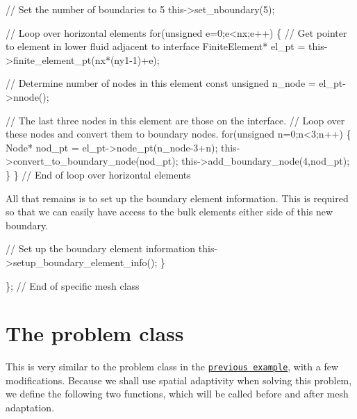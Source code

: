 \begin{DoxyCodeInclude}
   \textcolor{comment}{// Set the number of boundaries to 5}
   this->set\_nboundary(5);

   \textcolor{comment}{// Loop over horizontal elements}
   \textcolor{keywordflow}{for}(\textcolor{keywordtype}{unsigned} e=0;e<nx;e++)
    \{
     \textcolor{comment}{// Get pointer to element in lower fluid adjacent to interface}
     FiniteElement* el\_pt = this->finite\_element\_pt(nx*(ny1-1)+e);

     \textcolor{comment}{// Determine number of nodes in this element}
     \textcolor{keyword}{const} \textcolor{keywordtype}{unsigned} n\_node = el\_pt->nnode();

     \textcolor{comment}{// The last three nodes in this element are those on the interface.}
     \textcolor{comment}{// Loop over these nodes and convert them to boundary nodes.}
     \textcolor{keywordflow}{for}(\textcolor{keywordtype}{unsigned} n=0;n<3;n++)
      \{
       Node* nod\_pt = el\_pt->node\_pt(n\_node-3+n);
       this->convert\_to\_boundary\_node(nod\_pt);
       this->add\_boundary\_node(4,nod\_pt);
      \}
    \} \textcolor{comment}{// End of loop over horizontal elements}

\end{DoxyCodeInclude}


All that remains is to set up the boundary element information. This is required so that we can easily have access to the bulk elements either side of this new boundary.


\begin{DoxyCodeInclude}
   \textcolor{comment}{// Set up the boundary element information}
   this->setup\_boundary\_element\_info();
  \}

\}; \textcolor{comment}{// End of specific mesh class}

\end{DoxyCodeInclude}




 

\hypertarget{index_problem_class}{}\section{The problem class}\label{index_problem_class}
This is very similar to the problem class in the \href{../../single_layer_free_surface/html/index.html#problem_class}{\tt previous example}, with a few modifications. Because we shall use spatial adaptivity when solving this problem, we define the following two functions, which will be called before and after mesh adaptation.


